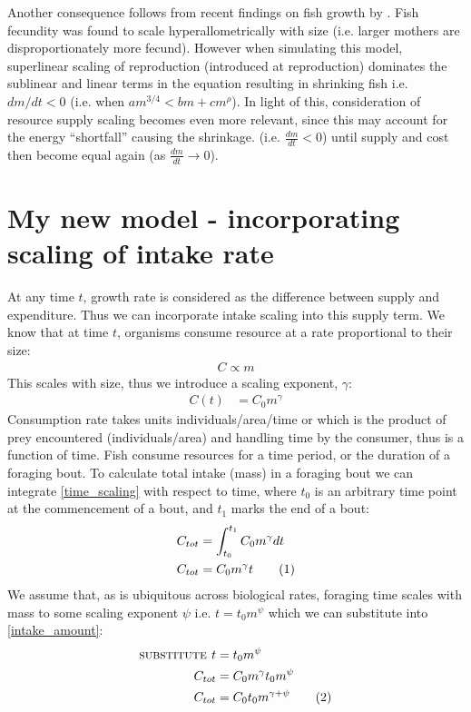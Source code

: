 \documentclass[a4paper]{article} %
\newcommand\numberthis{\addtocounter{equation}{1}\tag{\theequation}}
\begin{document}
Another consequence follows from recent findings on fish growth by \cite{Barneche2018d}. Fish fecundity was found to scale hyperallometrically with size (i.e. larger mothers are disproportionately more fecund). However when simulating this model, superlinear scaling of reproduction (introduced at reproduction) dominates the sublinear and linear terms in the equation resulting in shrinking fish i.e. $dm/dt < 0$ (i.e. when $am^{3/4} < bm + cm^{\rho}$). In light of this, consideration of resource supply scaling becomes even more relevant, since this may account for the energy ``shortfall'' causing the shrinkage. (i.e. $\frac{dm}{dt} < 0$) until supply and cost then become equal again (as $\frac{dm}{dt} \rightarrow 0$). 

\section{My new model - incorporating scaling of intake rate}
At any time $t$, growth rate is considered as the difference between supply and expenditure. Thus we can incorporate intake scaling into this supply term.
We know that at time $t$, organisms consume resource at a rate proportional to their size:
\begin{align*}
    C \propto m
\end{align*}
This scales with size, thus we introduce a scaling exponent, $\gamma$:
\begin{align}
    C(t) &= C_{0}m^{\gamma} \label{time_scaling}
\end{align}
Consumption rate takes units individuals/area/time or which is the product of prey encountered (individuals/area) and handling time by the consumer, thus is a function of time. Fish consume resources for a time period, or the duration of a foraging bout. To calculate total intake (mass) in a foraging bout we can integrate \eqref{time_scaling} with respect to time, where $t_0$ is an arbitrary time point at the commencement of a bout, and $t_1$ marks the end of a bout:
\begin{align*}
    C_{tot} &= \int_{t_{0}}^{t_{1}}C_{0}m^{\gamma}dt \\
    C_{tot} &= C_{0}m^{\gamma}t \numberthis \label{intake_amount}
\end{align*}
We assume that, as is ubiquitous across biological rates, foraging time scales with mass to some scaling exponent $\psi$ i.e. $t = t_{0}m^{\psi}$ which we can substitute into \eqref{intake_amount}:
\begin{align*}
    \textsc{substitute } t &= t_{0}m^{\psi} \\
    C_{tot} &= C_{0}m^{\gamma}t_{0}m^{\psi} \\
    C_{tot} &= C_{0}t_{0}m^{\gamma + \psi} \numberthis \label{total_intake}
\end{align*}
\end{document}
